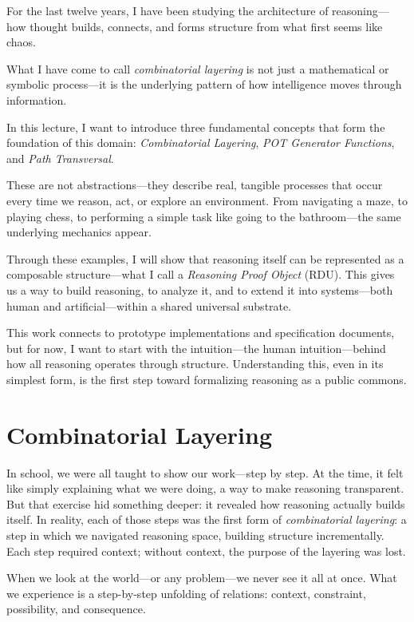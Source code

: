 \documentclass[11pt]{article}
\begin{document}
For the last twelve years, I have been studying the architecture of reasoning---how thought builds, connects, and forms structure from what first seems like chaos.

What I have come to call \textit{combinatorial layering} is not just a mathematical or symbolic process---it is the underlying pattern of how intelligence moves through information.

In this lecture, I want to introduce three fundamental concepts that form the foundation of this domain: \textit{Combinatorial Layering}, \textit{POT Generator Functions}, and \textit{Path Transversal}.

These are not abstractions---they describe real, tangible processes that occur every time we reason, act, or explore an environment. From navigating a maze, to playing chess, to performing a simple task like going to the bathroom---the same underlying mechanics appear.

Through these examples, I will show that reasoning itself can be represented as a composable structure---what I call a \textit{Reasoning Proof Object} (RDU). This gives us a way to build reasoning, to analyze it, and to extend it into systems---both human and artificial---within a shared universal substrate.

This work connects to prototype implementations and specification documents, but for now, I want to start with the intuition---the human intuition---behind how all reasoning operates through structure. Understanding this, even in its simplest form, is the first step toward formalizing reasoning as a public commons.

\section{Combinatorial Layering}

In school, we were all taught to show our work---step by step. At the time, it felt like simply explaining what we were doing, a way to make reasoning transparent. But that exercise hid something deeper: it revealed how reasoning actually builds itself. In reality, each of those steps was the first form of \textit{combinatorial layering}: a step in which we navigated reasoning space, building structure incrementally. Each step required context; without context, the purpose of the layering was lost.

When we look at the world---or any problem---we never see it all at once. What we experience is a step-by-step unfolding of relations: context, constraint, possibility, and consequence.
\end{document}
